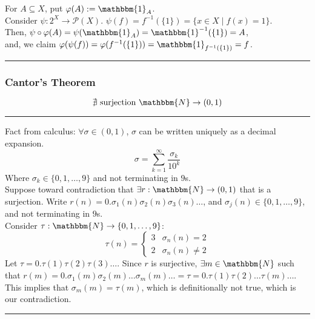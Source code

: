 \documentclass[10pt]{extarticle}
\begin{document}
      For $A\subseteq X$, put $\varphi(A) := \mathbbm{1}_A$.\\

      Consider $\psi: 2^X \rightarrow \mathcal{P}(X)$. $\psi(f) = f^{-1}(\{1\}) = \{x\in X \mid f(x) = 1\}$.\\

      Then, $\psi\circ\varphi(A) = \psi(\mathbbm{1}_A) = \mathbbm{1}^{-1}(\{1\}) = A$,\\

      and, we claim $\varphi(\psi(f)) = \varphi(f^{-1}(\{1\})) = \mathbbm{1}_{f^{-1}(\{1\})} = f$.\\
      \vspace{4pt}
      \rule{\textwidth}{0.4pt}
    \subsubsection{Cantor's Theorem}%
      \[
        \nexists~\text{surjection}~\mathbbm{N}\rightarrow (0,1)
      \] 
      \vspace{4pt}
      \rule{\textwidth}{0.4pt}
      \vspace{4pt}
      Fact from calculus: $\forall \sigma\in (0,1)$, $\sigma$ can be written uniquely as a decimal expansion.
      \[
        \sigma = \sum_{k=1}^{\infty} \frac{\sigma_k}{10^k}
      \] 
      Where $\sigma_k\in \{0,1,\dots,9\}$ and not terminating in $9$s.\\

      Suppose toward contradiction that $\exists r:\mathbbm{N} \rightarrow (0,1)$ that is a surjection. Write $r(n) = 0.\sigma_1(n)\sigma_2(n)\sigma_3(n)\dots$, and $\sigma_j(n) \in \{0,1,\dots,9\}$, and not terminating in $9$s.\\

      Consider $\tau: \mathbbm{N} \rightarrow \{0,1,\dots,9\}$:
      \[
        \tau(n) = \begin{cases}
          3 & \sigma_n(n) = 2\\
          2 & \sigma_n(n) \neq 2
        \end{cases}
      \]
      Let $\tau = 0.\tau(1)\tau(2)\tau(3)\dots$. Since $r$ is surjective, $\exists m\in \mathbbm{N}$ such that $r(m) = 0.\sigma_1(m)\sigma_2(m)\dots \sigma_m(m)\dots = \tau = 0.\tau(1)\tau(2)\dots\tau(m)\dots$.\\

      This implies that $\sigma_m(m) = \tau(m)$, which is definitionally not true, which is our contradiction.\\
      \vspace{4pt}
      \rule{\textwidth}{0.4pt}
\end{document}
